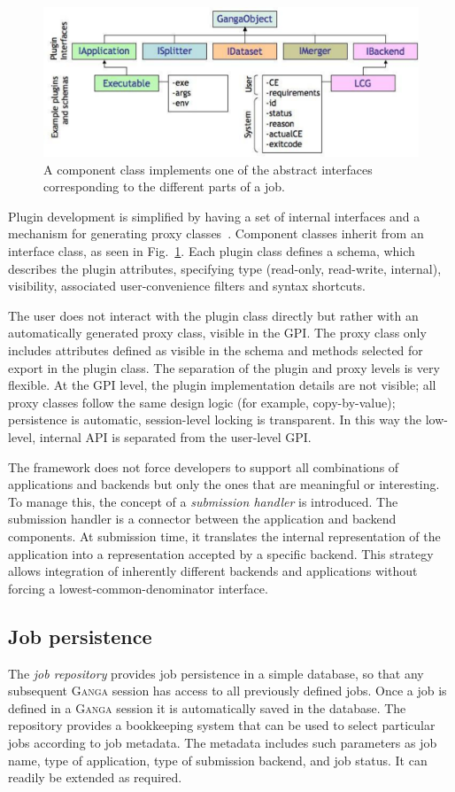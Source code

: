 \documentclass{elsart}
\def\ganga {\textsc{Ganga}\xspace}
\def\GPI{GPI\xspace}
\begin{document}
\begin{figure}
  \centering
  \includegraphics[width=14cm]{GangaPlugin.pdf}  
  \caption{A component class implements one of the abstract interfaces
    corresponding to the different parts of a job.}
  \label{fig:Components}
\end{figure}
Plugin development is simplified by having a set of internal interfaces and a
mechanism for generating proxy classes~\cite{GoF}. Component classes inherit from an interface class,
as seen in Fig.~\ref{fig:Components}. Each plugin class defines a schema, which
describes the plugin attributes, specifying type
(read-only, read-write, internal), visibility, associated user-convenience filters
and syntax shortcuts.

The user does not interact with the plugin class directly but rather with an
automatically generated proxy class, visible in the \GPI. The proxy
class only includes attributes defined as visible in the schema and methods
selected for export in the plugin class. The separation of the plugin and
proxy levels is very flexible. At the \GPI level, the plugin implementation
details are not visible; all proxy classes follow the same design logic (for
example, copy-by-value); persistence is automatic, session-level locking
is transparent. In this way the low-level, internal API is
separated from the user-level \GPI.

The framework does not force developers to support all combinations of
applications and backends but only the ones that are meaningful or interesting. To manage
this, the concept of a {\em submission handler} is introduced. The submission
handler is a connector between the application and backend components. At
submission time, it translates the internal representation of the application
into a representation accepted by a specific backend. This strategy allows
integration of inherently different backends and applications without forcing
a lowest-common-denominator interface.


\subsection{Job persistence}
\label{sec:persistence}
The \emph{job repository} provides job persistence in a simple database,
so that any subsequent \ganga session has access to all previously
defined jobs. Once a job is defined in a \ganga session it is automatically
saved in the database. The repository provides a bookkeeping system that can
be used to select particular jobs according to job metadata. The metadata
includes such parameters as job name, type of application, type of submission
backend, and job status. It can readily be extended as required.
\end{document}
